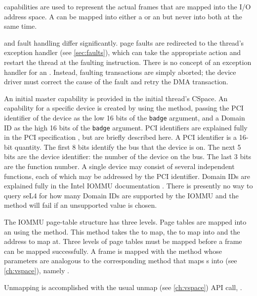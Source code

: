  capabilities are used to represent the actual frames that are
mapped into the I/O address space. A  can be mapped into
either a  or an  but never into both at the same time.

 and  fault handling differ significantly.
 page faults are redirected to the thread's exception handler (see \autoref{sec:faults}), 
which can take the
appropriate action and restart the thread at the faulting instruction.
There is no concept of an exception handler for an . Instead, faulting
transactions are simply
aborted; the device driver must correct the cause of the fault and retry
the DMA transaction.

An initial master  capability is provided in the initial thread's
CSpace. An  capability for a specific device is created by
using the  method, passing the
PCI identifier of the device as the low 16 bits of the \texttt{badge} argument, and
a Domain ID as the high 16 bits of the \texttt{badge} argument.
PCI identifiers are explained fully in the PCI specification 
\cite{Shanley:PCISA}, but are briefly described here. A PCI identifier is
a 16-bit quantity.  The first 8 bits identify the bus that the device is on.
The next 5 bits are the device identifier: the number of the device on
the bus. The last 3 bits are the function number. A single device may
consist of several independent functions, each of which may be addressed
by the PCI identifier.
Domain IDs are explained fully in the Intel IOMMU documentation \cite{extra:vtd}.
There is presently no way to query seL4 for how many Domain IDs are supported by
the IOMMU and the  method will fail if an
unsupported value is chosen.

The IOMMU page-table structure has three levels.
Page tables are mapped into an  using the  method.
This method takes the  to map, the  to map into 
and the address to map at. Three levels of page tables must be mapped before
a frame can be mapped successfully. A frame is mapped with the
 method whose parameters are analogous to
the corresponding method that maps s into  (see \autoref{ch:vspace}), 
namely .

Unmapping is accomplished with the usual unmap (see \autoref{ch:vspace}) API 
call,
.

